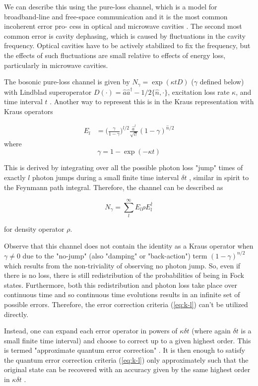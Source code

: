 \documentclass[12]{amsart}
\newcommand\0{\mathbf{0}}
\newcommand\<{\langle}
\renewcommand\>{\rangle}
\begin{document}
We can describe this using the pure-loss channel, which is a model for broadband-line and free-space communication and it is the most common incoherent error pro- cess in optical and microwave cavities \cite{albert2017performance}. The second most common error is cavity dephasing, which is caused by fluctuations in the cavity frequency. Optical cavities have to be actively stabilized to fix the frequency, but the effects of such fluctuations are small relative to effects of energy loss, particularly in microwave cavities. 

The bosonic pure-loss channel is given by $N_\gamma = \exp(\kappa t D)$ ($\gamma$ defined below) with Lindblad superoperator $D(\cdot) = \hat{a} \hat{a}^\dag - 1/2 \{ \hat{n} , \cdot \}$, excitation loss rate $\kappa$,  and time interval $t$ \cite{albert2017performance}. Another way to represent this is in the Kraus representation with Kraus operators

\begin{align}
\label{eq:kraus}
E_l &= \Big(\frac{\gamma}{1-\gamma}\Big)^{l / 2} \frac{\hat{a}^l}{\sqrt{l!}}(1 - \gamma)^{\hat{n} / 2}
\end{align}
where
$$
\gamma = 1 - \exp(- \kappa t)
$$

This is derived by integrating over all the possible photon loss "jump" times of exactly $l$ photon jumps during a small finite time interval $\delta t$ \cite{chuang1997bosonic}, similar in spirit to the Feynmann path integral. Therefore, the channel can be described as 

$$
N_\gamma = \sum_l^\infty E_l \rho E_l^\dag
$$

for density operator $\rho$.

Observe that this channel does not contain the identity as a Kraus operator when $\gamma \neq 0$ due to the "no-jump" (also "damping" or "back-action") term $(1-\gamma)^{n / 2}$ which results from the non-triviality of observing no photon jump. So, even if there is no loss, there is still redistribution of the probabilities of being in Fock states. Furthermore, both this redistribution and photon loss take place over continuous time and so continuous time evolutions results in an infinite set of possible errors. Therefore, the error correction criteria (\ref{eq:k-l}) can't be utilized directly. 

Instead, one can expand each error operator in powers of $\kappa \delta t$ (where again $\delta t$ is a small finite time interval) and choose to correct up to a given highest order. This is termed "approximate quantum error correction" \cite{mandayam2012towards}. It is then enough to satisfy the quantum error correction criteria (\ref{eq:k-l}) only approximately such that the original state can be recovered with an accuracy given by the same highest order in $\kappa \delta t$ \cite{michael2016new}.
\end{document}
